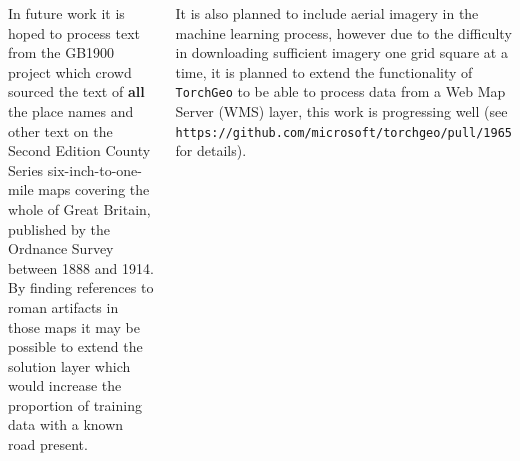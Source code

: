\documentclass[17pt,
    margin=0.5in,
    innermargin=-4.5in,
    ]{tikzposter}
\begin{document}
\begin{columns}
{       In future work it is hoped to process text from the GB1900 project \citep{university_of_portsmouth_vision_2023} which crowd sourced the text of \textbf{all} the place names and other text on the Second Edition County Series six-inch-to-one-mile maps covering the whole of Great Britain, published by the Ordnance Survey between 1888 and 1914. By finding references to roman artifacts in those maps it may be possible to extend the solution layer which would increase the proportion of training data with a known road present. 

       It is also planned to include aerial imagery in the machine learning process, however due to the difficulty in downloading sufficient imagery one grid square at a time, it is planned to extend the functionality of \texttt{TorchGeo} to be able to process data from a Web Map Server (WMS) layer, this work is progressing well (see \texttt{https://github.com\-/micro\-soft/torchgeo/pull/1965} for details). 


    }
    


\end{columns}
\end{document}
